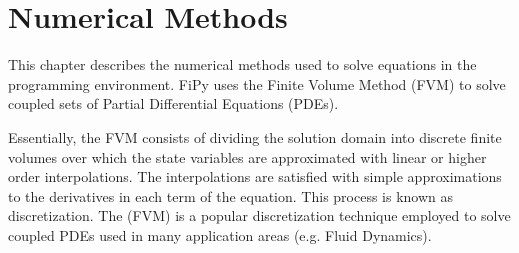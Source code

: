 \chapter{Numerical Methods}

This chapter describes the numerical methods used to solve equations
in the \FiPy{} programming environment. FiPy{} uses the Finite Volume
Method (FVM) to solve coupled sets of Partial Differential Equations
(PDEs).

Essentially, the FVM consists of dividing the solution domain into
discrete finite volumes over which the state variables are
approximated with linear or higher order interpolations. The
interpolations are satisfied with simple approximations to the
derivatives in each term of the equation. This process is known as
discretization. The (FVM) is a popular discretization technique
employed to solve coupled PDEs used in many application areas
(e.g. Fluid Dynamics).






